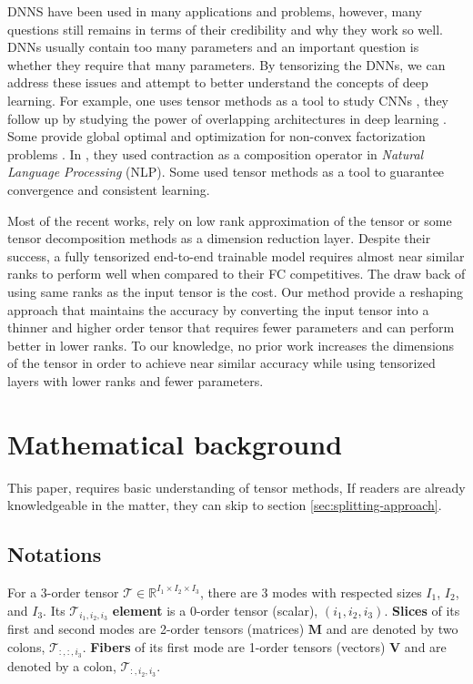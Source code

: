 \documentclass{article}
\begin{document}
DNNS have been used in many applications and problems, however, many questions still remains in terms of their credibility and why they work so well. DNNs usually contain too many parameters and an important question is whether they require that many parameters.
By tensorizing the DNNs, we can address these issues and attempt to better understand the concepts of deep learning. For example, one uses tensor methods as a tool to study CNNs \cite{r12}, they follow up by studying the power of overlapping architectures in deep learning \cite{r13}. Some provide global optimal and optimization for non-convex factorization problems \cite{r14}. In \cite{r15}, they used contraction as a composition operator in \textit{Natural Language Processing} (NLP). Some used tensor methods as a tool to guarantee convergence and consistent learning\cite{r16}.


Most of the recent works, rely on low rank approximation of the tensor or some tensor decomposition methods as a dimension reduction layer. Despite their success, a fully tensorized end-to-end trainable model requires almost near similar ranks to perform well when compared to their FC competitives. The draw back of using same ranks as the input tensor is the cost. Our method provide a reshaping approach that maintains the accuracy by converting the input tensor into a thinner and higher order tensor that requires fewer parameters and can perform better in lower ranks. To our knowledge, no prior work increases the dimensions of the tensor in order to achieve near similar accuracy while using tensorized layers with lower ranks and fewer parameters. 

\section{Mathematical background}
\label{sec:mathematical-background}
This paper, requires basic understanding of tensor methods, If readers are already knowledgeable in the matter, they can skip to section \ref{sec:splitting-approach}.

\subsection{Notations}
\label{subsec:notations}

For a 3-order tensor $ \mathcal{T} \in \mathbb{R}^{I_1\times I_2\times I_3}$, there are 3 modes with respected sizes $I_1$, $I_2$, and $I_3$. 
Its $\mathcal{T}_{i_1, i_2, i_3}$ 
\textbf{element}
is a 0-order tensor (scalar), $(i_1, i_2, i_3)$. 
\textbf{Slices} of its first and second modes are 2-order tensors (matrices) $\mathbf{M}$ and are denoted by two colons, $\mathcal{T}_{:,:,i_3}$. 
\textbf{Fibers} of its first mode are 1-order tensors (vectors) $\mathbf{V}$ and are denoted by a colon, $\mathcal{T}_{:, i_2, i_3}$.
\end{document}
